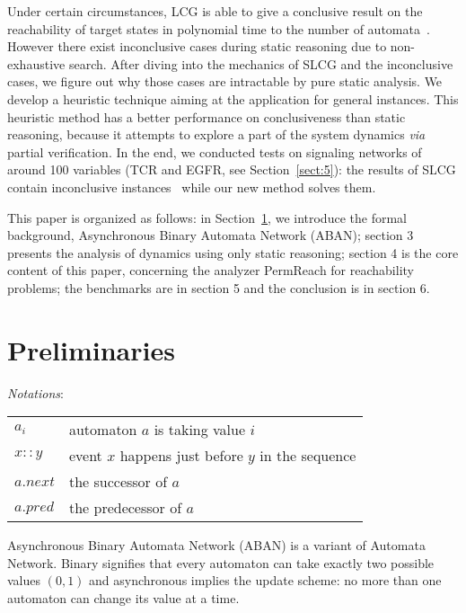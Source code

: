 \documentclass{article}
\theoremstyle{definition}
\begin{document}
Under certain circumstances, LCG is able to give a conclusive result on the reachability of target states in polynomial time to the number of automata~\cite{pauleve2016goal}. 
However there exist inconclusive cases during static reasoning due to non-exhaustive search.
After diving into the mechanics of SLCG and the inconclusive cases, we figure out why those cases are intractable by pure static analysis. 
We develop a heuristic technique aiming at the application for general instances. 
This heuristic method has a better performance on conclusiveness than static reasoning, because it attempts to explore a part of the system dynamics \textit{via} partial verification.
In the end, we conducted tests on signaling networks of around 100 variables (TCR and EGFR, see Section~\ref{sect:5}): the results of SLCG contain inconclusive instances~\cite{folschette2015} while our new method solves them.

This paper is organized as follows: in Section~\ref{sect:preliminaries}, we introduce the formal background, Asynchronous Binary Automata Network (ABAN); section 3 presents the analysis of dynamics using only static reasoning; 
section 4 is the core content of this paper, concerning the analyzer PermReach for reachability problems; 
the benchmarks are in section 5 and the conclusion is in section 6.
\section{Preliminaries}\label{sect:preliminaries}
\textit{Notations}:

\begin{tabular}{l|l}
$a_i$& automaton $a$ is taking value $i$\\

$x::y$& event $x$ happens just before $y$ in the sequence\\

$a.next$& the successor of $a$\\ $a.pred$& the predecessor of $a$
\end{tabular}

Asynchronous Binary Automata Network (ABAN) is a variant of Automata Network.
Binary signifies that every automaton can take exactly two possible values $(0,1)$ and asynchronous implies the update scheme: no more than one automaton can change its value at a time. 
\end{document}
